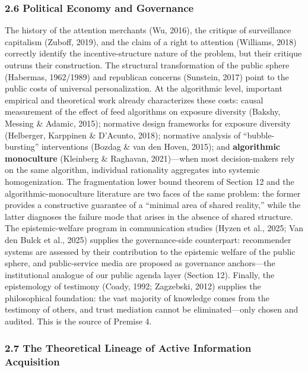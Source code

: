 \documentclass[
  11pt]{article}
\begin{document}
\subsubsection{2.6 Political Economy and
Governance}\label{political-economy-and-governance}

The history of the attention merchants (Wu, 2016), the critique of
surveillance capitalism (Zuboff, 2019), and the claim of a right to
attention (Williams, 2018) correctly identify the incentive-structure
nature of the problem, but their critique outruns their construction.
The structural transformation of the public sphere (Habermas, 1962/1989)
and republican concerns (Sunstein, 2017) point to the public costs of
universal personalization. At the algorithmic level, important empirical
and theoretical work already characterizes these costs: causal
measurement of the effect of feed algorithms on exposure diversity
(Bakshy, Messing \& Adamic, 2015); normative design frameworks for
exposure diversity (Helberger, Karppinen \& D'Acunto, 2018); normative
analysis of ``bubble-bursting'' interventions (Bozdag \& van den Hoven,
2015); and \textbf{algorithmic monoculture} (Kleinberg \& Raghavan,
2021)---when most decision-makers rely on the same algorithm, individual
rationality aggregates into systemic homogenization. The fragmentation
lower bound theorem of Section 12 and the algorithmic-monoculture
literature are two faces of the same problem: the former provides a
constructive guarantee of a ``minimal area of shared reality,'' while
the latter diagnoses the failure mode that arises in the absence of
shared structure. The epistemic-welfare program in communication studies
(Hyzen et al., 2025; Van den Bulck et al., 2025) supplies the
governance-side counterpart: recommender systems are assessed by their
contribution to the epistemic welfare of the public sphere, and
public-service media are proposed as governance anchors---the
institutional analogue of our public agenda layer (Section 12). Finally,
the epistemology of testimony (Coady, 1992; Zagzebski, 2012) supplies
the philosophical foundation: the vast majority of knowledge comes from
the testimony of others, and trust mediation cannot be eliminated---only
chosen and audited. This is the source of Premise 4.

\subsubsection{2.7 The Theoretical Lineage of Active Information
Acquisition}\label{the-theoretical-lineage-of-active-information-acquisition}
\end{document}
